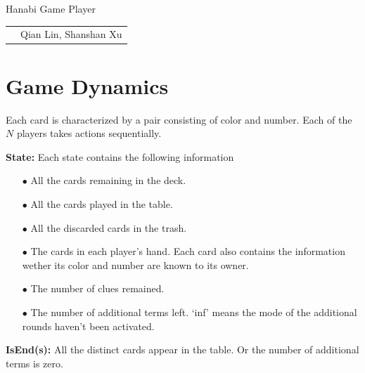 \documentclass[12pt]{article}
\begin{document}
\begin{center}
{\Large Hanabi Game Player}

\begin{tabular}{rl}
\\
&Qian Lin, Shanshan Xu \\
\end{tabular}
\end{center}


\section{Game Dynamics}
Each card is characterized by a pair consisting of color and number.
Each of the $N$ players takes actions sequentially.

\textbf{State:}  Each state contains the following information
\begin{itemize}
\item[$\bullet$] All the cards remaining in the deck. 
\item[$\bullet$] All the cards played in the table.
\item[$\bullet$] All the discarded cards in the trash.
\item[$\bullet$] The cards in each player's hand. Each card also contains the information wether its color and number are known to its owner. 
\item[$\bullet$] The number of clues remained.
\item[$\bullet$] The number of additional terms left. `inf' means the mode of the additional rounds haven't been activated.   
\end{itemize}

\textbf{IsEnd(s):} All the distinct cards appear in the table. Or the number of additional terms is zero.
\end{document}
